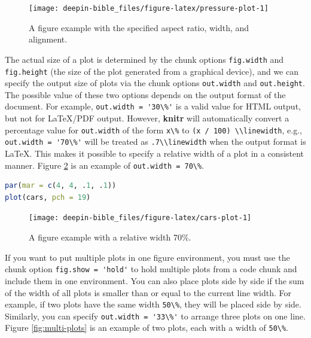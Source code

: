 \documentclass[doctor,openright,twoside]{sjtuthesis}
\newcommand{\passthrough}[1]{#1}
\theoremstyle{plain}
\theoremstyle{definition}
\theoremstyle{remark}
\theoremstyle{ocrenumbox}
\theoremstyle{plain}
\begin{document}
\begin{figure}

{\centering \texttt{[image: deepin-bible\_files/figure-latex/pressure-plot-1]} 

}

\caption[A figure example with the specified aspect ratio, width, and alignment]{A figure example with the specified aspect ratio, width, and alignment.}\label{fig:pressure-plot}
\end{figure}

The actual size of a plot is determined by the chunk options \passthrough{\lstinline!fig.width!} and \passthrough{\lstinline!fig.height!} (the size of the plot generated from a graphical device), and we can specify the output size of plots via the chunk options \passthrough{\lstinline!out.width!} and \passthrough{\lstinline!out.height!}. The possible value of these two options depends on the output format of the document. For example, \passthrough{\lstinline!out.width = '30\%'!} is a valid value for HTML output, but not for LaTeX/PDF output. However, \textbf{knitr} will automatically convert a percentage value for \passthrough{\lstinline!out.width!} of the form \passthrough{\lstinline!x\%!} to \passthrough{\lstinline!(x / 100) \\linewidth!}, e.g., \passthrough{\lstinline!out.width = '70\%'!} will be treated as \passthrough{\lstinline!.7\\linewidth!} when the output format is LaTeX. This makes it possible to specify a relative width of a plot in a consistent manner. Figure \ref{fig:cars-plot} is an example of \passthrough{\lstinline!out.width = 70\%!}.

\begin{lstlisting}[language=R]
par(mar = c(4, 4, .1, .1))
plot(cars, pch = 19)
\end{lstlisting}

\begin{figure}
\texttt{[image: deepin-bible\_files/figure-latex/cars-plot-1]} \caption[A figure example with a relative width 70\%]{A figure example with a relative width 70\%.}\label{fig:cars-plot}
\end{figure}

If you want to put multiple plots in one figure environment, you must use the chunk option \passthrough{\lstinline!fig.show = 'hold'!} to hold multiple plots from a code chunk and include them in one environment. You can also place plots side by side if the sum of the width of all plots is smaller than or equal to the current line width. For example, if two plots have the same width \passthrough{\lstinline!50\%!}, they will be placed side by side. Similarly, you can specify \passthrough{\lstinline!out.width = '33\%'!} to arrange three plots on one line. Figure \ref{fig:multi-plots} is an example of two plots, each with a width of \passthrough{\lstinline!50\%!}.
\end{document}
